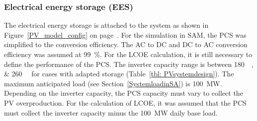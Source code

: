 \clearpage
\subsubsection{Electrical energy storage (EES)}

The electrical energy storage is attached to the system as shown in Figure~\ref{PV_model_config} on page~\pageref{PV_model_config}. For the simulation in SAM, the PCS was simplified to the conversion efficiency. The AC to DC and DC to AC conversion efficiency was assumed at \SI{99}{\percent}. For the LCOE calculation, it is still necessary to define the performance of the PCS. The inverter capacity range is between \SIlist{180;260}{\mega\wattsac} for cases with adapted storage (Table~\ref{tbl: PVsystemdesign}). The maximum anticipated load (see Section~\ref{SystemloadinSA}) is \SI{100}{\mega\watt}. Depending on the inverter capacity, the PCS capacity must vary to collect the  PV overproduction. For the calculation of LCOE, it was assumed that the PCS must collect the inverter capacity minus the \SI{100}{MW} daily base load.


